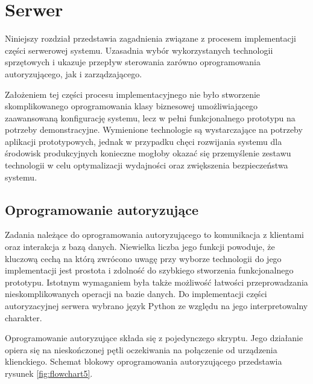 \chapter{Serwer}
\label{chap:server}

    Niniejszy rozdział przedstawia zagadnienia związane z procesem implementacji części serwerowej systemu. Uzasadnia wybór wykorzystanych technologii sprzętowych i ukazuje przepływ sterowania zarówno oprogramowania autoryzującego, jak i zarządzającego.

    Założeniem tej części procesu implementacyjnego nie było stworzenie skomplikowanego oprogramowania klasy biznesowej umożliwiającego zaawansowaną konfigurację systemu, lecz w pełni funkcjonalnego prototypu na potrzeby demonstracyjne. Wymienione technologie są wystarczające na potrzeby aplikacji prototypowych, jednak w przypadku chęci rozwijania systemu dla środowisk produkcyjnych konieczne mogłoby okazać się przemyślenie zestawu technologii w celu optymalizacji wydajności oraz zwiększenia bezpieczeństwa systemu.

    \section{Oprogramowanie autoryzujące}
    \label{s:auth_subs}

    	Zadania należące do oprogramowania autoryzującego to komunikacja z klientami oraz interakcja z bazą danych. Niewielka liczba jego funkcji powoduje, że kluczową cechą na którą zwrócono uwagę przy wyborze technologii do jego implementacji jest prostota i zdolność do szybkiego stworzenia funkcjonalnego prototypu. Istotnym wymaganiem była także możliwość łatwości przeprowadzania nieskomplikowanych operacji na bazie danych. Do implementacji części autoryzacyjnej serwera wybrano język Python ze względu na jego interpretowalny charakter. 

    	Oprogramowanie autoryzujące składa się z pojedynczego skryptu. Jego działanie opiera się na nieskończonej pętli oczekiwania na połączenie od urządzenia klienckiego. Schemat blokowy oprogramowania autoryzującego przedstawia rysunek \ref{fig:flowchart5}.

